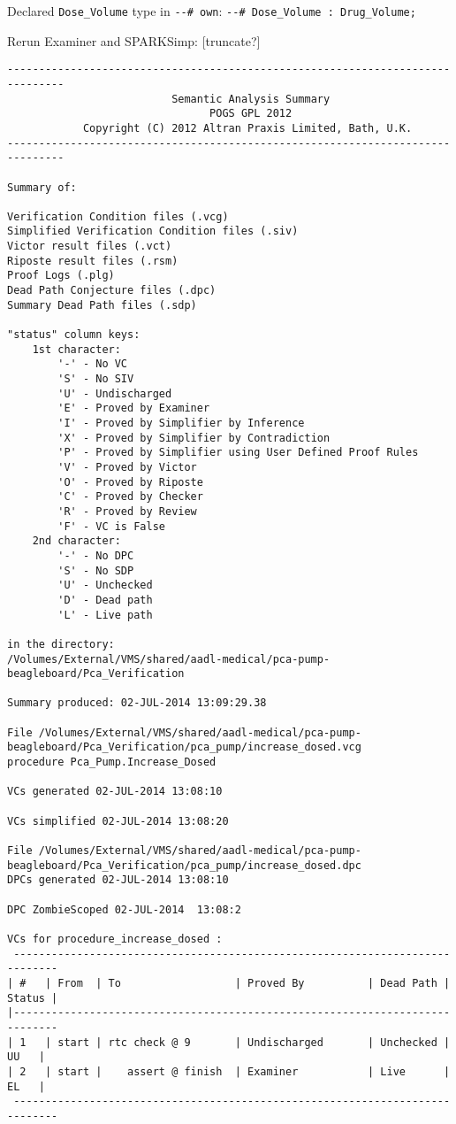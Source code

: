 Declared \lstinline{Dose_Volume} type in \lstinline{--# own}: \lstinline{--# Dose_Volume : Drug_Volume;}

Rerun Examiner and SPARKSimp:
[truncate?]
\begin{lstlisting}[frame=single, gobble=0, caption={Second POGS report}, label={listing:pcapump_dosemonitor_pogs2}]
-------------------------------------------------------------------------------
                          Semantic Analysis Summary                            
                                POGS GPL 2012                                  
            Copyright (C) 2012 Altran Praxis Limited, Bath, U.K.               
-------------------------------------------------------------------------------

Summary of:

Verification Condition files (.vcg)
Simplified Verification Condition files (.siv)
Victor result files (.vct)
Riposte result files (.rsm)
Proof Logs (.plg)
Dead Path Conjecture files (.dpc)
Summary Dead Path files (.sdp)

"status" column keys:
    1st character:
        '-' - No VC
        'S' - No SIV
        'U' - Undischarged
        'E' - Proved by Examiner
        'I' - Proved by Simplifier by Inference
        'X' - Proved by Simplifier by Contradiction
        'P' - Proved by Simplifier using User Defined Proof Rules
        'V' - Proved by Victor
        'O' - Proved by Riposte
        'C' - Proved by Checker
        'R' - Proved by Review
        'F' - VC is False
    2nd character:
        '-' - No DPC
        'S' - No SDP
        'U' - Unchecked
        'D' - Dead path
        'L' - Live path

in the directory:
/Volumes/External/VMS/shared/aadl-medical/pca-pump-beagleboard/Pca_Verification

Summary produced: 02-JUL-2014 13:09:29.38

File /Volumes/External/VMS/shared/aadl-medical/pca-pump-beagleboard/Pca_Verification/pca_pump/increase_dosed.vcg
procedure Pca_Pump.Increase_Dosed

VCs generated 02-JUL-2014 13:08:10

VCs simplified 02-JUL-2014 13:08:20

File /Volumes/External/VMS/shared/aadl-medical/pca-pump-beagleboard/Pca_Verification/pca_pump/increase_dosed.dpc
DPCs generated 02-JUL-2014 13:08:10

DPC ZombieScoped 02-JUL-2014  13:08:2

VCs for procedure_increase_dosed :
 -----------------------------------------------------------------------------
| #   | From  | To                  | Proved By          | Dead Path | Status |
|-----------------------------------------------------------------------------
| 1   | start | rtc check @ 9       | Undischarged       | Unchecked |   UU   |
| 2   | start |    assert @ finish  | Examiner           | Live      |   EL   |
 -----------------------------------------------------------------------------



\end{lstlisting}

